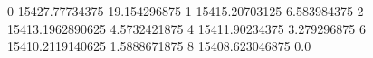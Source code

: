0 15427.77734375 19.154296875
1 15415.20703125 6.583984375
2 15413.1962890625 4.5732421875
4 15411.90234375 3.279296875
6 15410.2119140625 1.5888671875
8 15408.623046875 0.0
